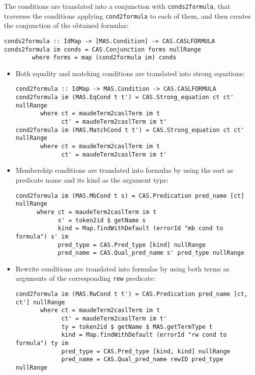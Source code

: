 The conditions are translated into a conjunction with \verb"conds2formula",
that traverses the conditions applying \verb"cond2formula" to each of them,
and then creates the conjunction of the obtained formulas:

{\codesize
\begin{verbatim}
conds2formula :: IdMap -> [MAS.Condition] -> CAS.CASLFORMULA
conds2formula im conds = CAS.Conjunction forms nullRange
        where forms = map (cond2formula im) conds
\end{verbatim}
}

\begin{itemize}

\item Both equality and matching conditions are translated into
strong equations:

{\codesize
\begin{verbatim}
cond2formula :: IdMap -> MAS.Condition -> CAS.CASLFORMULA
cond2formula im (MAS.EqCond t t') = CAS.Strong_equation ct ct' nullRange
       where ct = maudeTerm2caslTerm im t
             ct' = maudeTerm2caslTerm im t'
cond2formula im (MAS.MatchCond t t') = CAS.Strong_equation ct ct' nullRange
       where ct = maudeTerm2caslTerm im t
             ct' = maudeTerm2caslTerm im t'
\end{verbatim}
}

\item Membership conditions are translated into formulas by using the sort
as predicate name and its kind as the argument type:

{\codesize
\begin{verbatim}
cond2formula im (MAS.MbCond t s) = CAS.Predication pred_name [ct] nullRange
      where ct = maudeTerm2caslTerm im t
            s' = token2id $ getName s
            kind = Map.findWithDefault (errorId "mb cond to formula") s' im
            pred_type = CAS.Pred_type [kind] nullRange
            pred_name = CAS.Qual_pred_name s' pred_type nullRange
\end{verbatim}
}

\item Rewrite conditions are translated into formulas by using both terms
as arguments of the corresponding \verb"rew" predicate: 

{\codesize
\begin{verbatim}
cond2formula im (MAS.RwCond t t') = CAS.Predication pred_name [ct, ct'] nullRange
       where ct = maudeTerm2caslTerm im t
             ct' = maudeTerm2caslTerm im t'
             ty = token2id $ getName $ MAS.getTermType t
             kind = Map.findWithDefault (errorId "rw cond to formula") ty im
             pred_type = CAS.Pred_type [kind, kind] nullRange
             pred_name = CAS.Qual_pred_name rewID pred_type nullRange
\end{verbatim}
}

\end{itemize}

